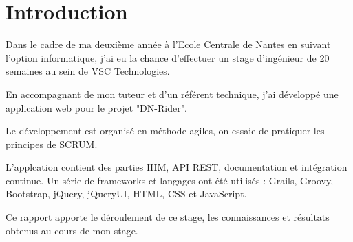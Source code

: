 \chapter{Introduction}
\label{chap:Introduction}

Dans le cadre de ma deuxième année à l'Ecole Centrale de Nantes en suivant l'option informatique,
j'ai eu la chance d'effectuer un stage d'ingénieur de 20 semaines au sein de VSC Technologies.

En accompagnant de mon tuteur et d'un référent technique, j'ai développé une application web pour le projet "DN-Rider".

Le développement est organisé en méthode agiles, on essaie de pratiquer les principes de SCRUM.

L'applcation contient des parties IHM, API REST, documentation et intégration continue.
Un série de frameworks et langages ont été utilisés : Grails, Groovy, Bootstrap, jQuery, jQueryUI, HTML, CSS et JavaScript.

Ce rapport apporte le déroulement de ce stage, les connaissances et résultats obtenus au cours de mon stage.
